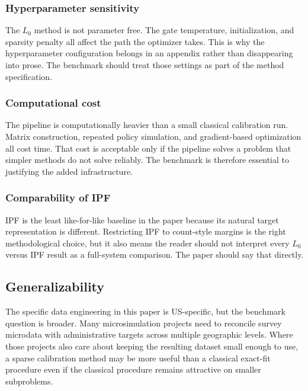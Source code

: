 \subsubsection{Hyperparameter sensitivity}

The $L_0$ method is not parameter free. The gate temperature, initialization, and sparsity penalty
all affect the path the optimizer takes. This is why the hyperparameter configuration belongs in an
appendix rather than disappearing into prose. The benchmark should treat those settings as part of
the method specification.

\subsubsection{Computational cost}

The pipeline is computationally heavier than a small classical calibration run. Matrix
construction, repeated policy simulation, and gradient-based optimization all cost time. That cost
is acceptable only if the pipeline solves a problem that simpler methods do not solve reliably. The
benchmark is therefore essential to justifying the added infrastructure.

\subsubsection{Comparability of IPF}

IPF is the least like-for-like baseline in the paper because its natural target representation is
different. Restricting IPF to count-style margins is the right methodological choice, but it also
means the reader should not interpret every $L_0$ versus IPF result as a full-system comparison.
The paper should say that directly.

\subsection{Generalizability}

The specific data engineering in this paper is US-specific, but the benchmark question is broader.
Many microsimulation projects need to reconcile survey microdata with administrative targets across
multiple geographic levels. Where those projects also care about keeping the resulting dataset
small enough to use, a sparse calibration method may be more useful than a classical exact-fit
procedure even if the classical procedure remains attractive on smaller subproblems.
